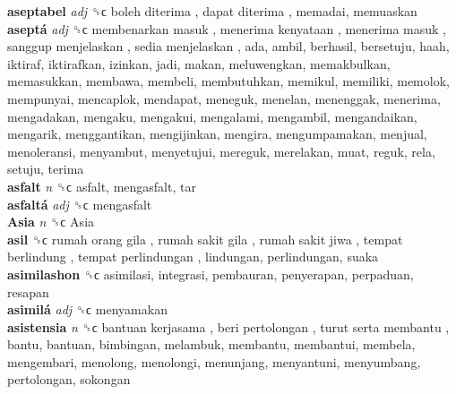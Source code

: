 \textbf{aseptabel} \emph{adj}  ␝ϲ   boleh diterima ,  dapat diterima , memadai, memuaskan  \\
\textbf{aseptá} \emph{adj}  ␝ϲ   membenarkan masuk ,  menerima kenyataan ,  menerima masuk ,  sanggup menjelaskan ,  sedia menjelaskan , ada, ambil, berhasil, bersetuju, haah, iktiraf, iktirafkan, izinkan, jadi, makan, meluwengkan, memakbulkan, memasukkan, membawa, membeli, membutuhkan, memikul, memiliki, memolok, mempunyai, mencaplok, mendapat, meneguk, menelan, menenggak, menerima, mengadakan, mengaku, mengakui, mengalami, mengambil, mengandaikan, mengarik, menggantikan, mengijinkan, mengira, mengumpamakan, menjual, menoleransi, menyambut, menyetujui, mereguk, merelakan, muat, reguk, rela, setuju, terima  \\
\textbf{asfalt} \emph{n}  ␝ϲ  asfalt, mengasfalt, tar  \\
\textbf{asfaltá} \emph{adj}  ␝ϲ  mengasfalt  \\
\textbf{Asia} \emph{n}  ␝ϲ   Asia   \\
\textbf{asil} ␝ϲ   rumah orang gila ,  rumah sakit gila ,  rumah sakit jiwa ,  tempat berlindung ,  tempat perlindungan , lindungan, perlindungan, suaka  \\
\textbf{asimilashon} ␝ϲ  asimilasi, integrasi, pembauran, penyerapan, perpaduan, resapan  \\
\textbf{asimilá} \emph{adj}  ␝ϲ  menyamakan  \\
\textbf{asistensia} \emph{n}  ␝ϲ   bantuan kerjasama ,  beri pertolongan ,  turut serta membantu , bantu, bantuan, bimbingan, melambuk, membantu, membantui, membela, mengembari, menolong, menolongi, menunjang, menyantuni, menyumbang, pertolongan, sokongan  \\
